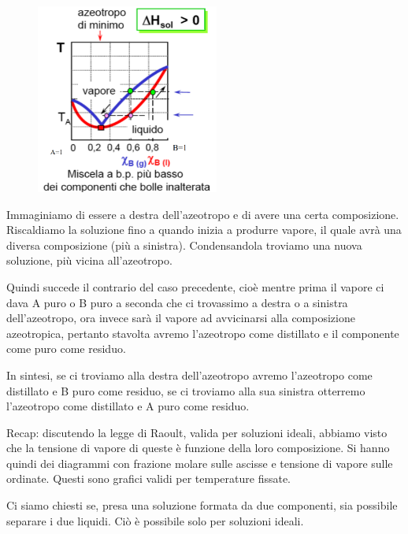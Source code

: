 \vspace{-0.2cm}\begin{minipage}{0.4\textwidth}
    \begin{figure}[H]
        \includegraphics[width=6cm]{immagini/distillazione_endotermica.png}
    \end{figure}
\end{minipage}
\begin{minipage}{0.6\textwidth}
    \vspace{0.6cm}Immaginiamo di essere a destra dell'azeotropo e di avere una certa composizione. Riscaldiamo la soluzione fino a quando inizia a produrre vapore, il quale avrà una diversa composizione (più a sinistra). Condensandola troviamo una nuova soluzione, più vicina all'azeotropo.

    Quindi succede il contrario del caso precedente, cioè mentre prima il vapore ci dava A puro o B puro a seconda che ci trovassimo a destra o a sinistra dell'azeotropo, ora invece sarà il vapore ad avvicinarsi alla composizione azeotropica, pertanto stavolta avremo l'azeotropo come distillato e il componente come puro come residuo.
\end{minipage}

\vspace{0.2cm}In sintesi, se ci troviamo alla destra dell'azeotropo avremo l'azeotropo come distillato e B puro come residuo, se ci troviamo alla sua sinistra otterremo l'azeotropo come distillato e A puro come residuo.

\vspace{0.2cm}Recap: discutendo la legge di Raoult, valida per soluzioni ideali, abbiamo visto che la tensione di vapore di queste è funzione della loro composizione. Si hanno quindi dei diagrammi con frazione molare sulle ascisse e tensione di vapore sulle ordinate. Questi sono grafici validi per temperature fissate.

Ci siamo chiesti se, presa una soluzione formata da due componenti, sia possibile separare i due liquidi. Ciò è possibile solo per soluzioni ideali.

